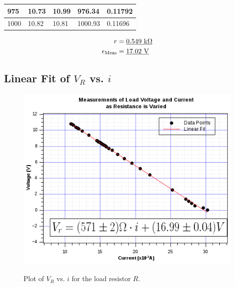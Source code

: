\documentclass[twocolumn,english]{IEEEtran}
\theoremstyle{plain}
\theoremstyle{plain}
\begin{document}
\begin{table}[htpb]
\begin{tabular}{|l|l|l|l|l|}
975                                                                                              & 10.73                                                                               & 10.99                                                                                & 976.34                                                                                               & 0.11792                              \\ \hline
1000                                                                                             & 10.82                                                                               & 10.81                                                                                & 1000.93                                                                                              & 0.11696                              \\ \hline
\end{tabular}
\end{table}


\begin{align*}
 r &= \text{\underline{0.549 k$\Omega$}} \\
 \epsilon_{\text{Meas}} &= \text{\underline{17.02 V}}
\end{align*}

  \subsection{\textbf{Linear Fit of $V_R$ vs. $i$}}

  \begin{figure}[htpb]
  \begin{centering}
  \begin{center}
  \includegraphics[width=\linewidth]{./Images/vi_graph.png}
  \label{fig:vigraph}
  \caption{Plot of $V_R$ vs. $i$ for the load resistor $R$.}
  \end{center}
  \par\end{centering}
  \end{figure}
\end{document}
